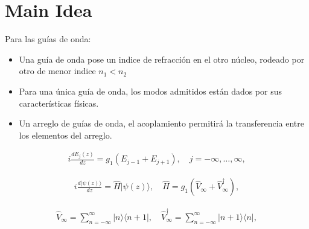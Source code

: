 \section{Main Idea}\label{sec:develop}
Para las guías de onda:
\begin{itemize}
    \item Una guía de onda pose un indice de refracción en el otro núcleo, rodeado por otro de menor indice $n_1 < n_2$
    \item Para una única guía de onda, los modos admitidos están dados por sus características físicas. 
    \item Un arreglo de guías de onda, el acoplamiento permitirá la transferencia entre los elementos del arreglo.
\end{itemize}
\begin{align}
    i \frac{dE_j(z)}{dz} = g_1 (E_{j-1} + E_{j+1}), \quad j = -\infty, \dots, \infty,
\end{align}

\begin{align}
     i \frac{d|\psi(z)\rangle}{dz} = \hat{H}|\psi(z)\rangle, \quad \hat{H} = g_1 \left( \hat{V}_\infty + \hat{V}_\infty^\dagger \right),
\end{align}

\begin{align}
      \hat{V}_\infty = \sum_{n=-\infty}^{\infty} |n\rangle \langle n+1|, 
\quad \hat{V}_\infty^\dagger = \sum_{n=-\infty}^{\infty} |n+1\rangle \langle n|, 
\end{align}

